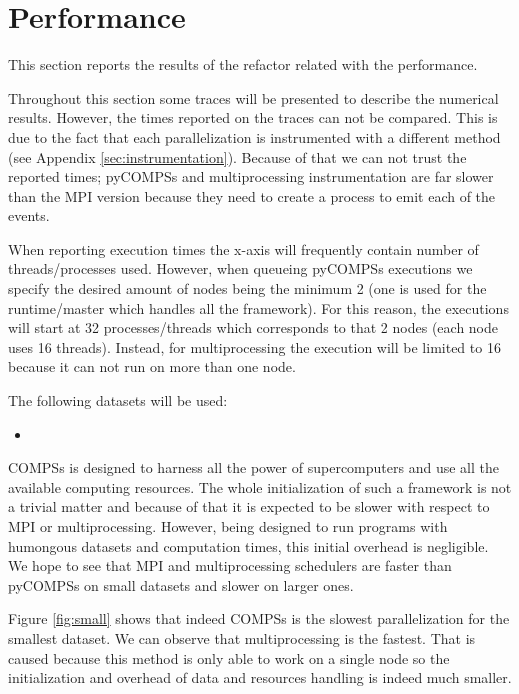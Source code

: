 \section{Performance}

\label{sec:resperformance}

This section reports the results of the refactor related with the performance. 

Throughout this section some traces will be presented to describe the numerical results. However, the times reported on the traces can not be compared. This is due to the fact that each parallelization is instrumented with a different method (see Appendix \ref{sec:instrumentation}). Because of that we can not trust the reported times; pyCOMPSs and multiprocessing instrumentation are far slower than the MPI version because they need to create a process to emit each of the events.

When reporting execution times the x-axis will frequently contain number of threads/processes used. However, when queueing pyCOMPSs executions we specify the desired amount of nodes being the minimum 2 (one is used for the runtime/master which handles all the framework). For this reason, the executions will start at 32 processes/threads which corresponds to that 2 nodes (each node uses 16 threads). Instead, for multiprocessing the execution will be limited to 16 because it can not run on more than one node.


The following datasets will be used:

\begin{itemize}
\item
\end{itemize}

COMPSs is designed to harness all the power of supercomputers and use all the available computing resources. The whole initialization of such a framework is not a trivial matter and because of that it is expected to be slower with respect to MPI or multiprocessing. However, being designed to run programs with humongous datasets and computation times, this initial overhead is negligible. We hope to see that MPI and multiprocessing schedulers are faster than pyCOMPSs on small datasets and slower on larger ones. 

Figure \ref{fig:small} shows that indeed COMPSs is the slowest parallelization for the smallest dataset. We can observe that multiprocessing is the fastest. That is caused because this method is only able to work on a single node so the initialization and overhead of data and resources handling is indeed much smaller.

